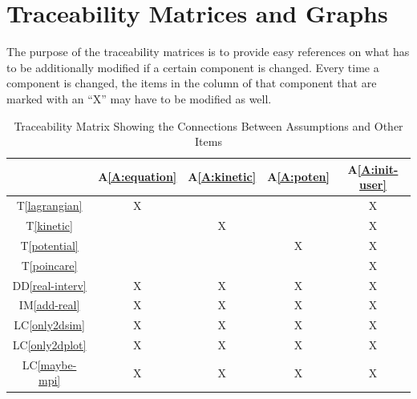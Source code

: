 \documentclass[12pt]{article}
\newcommand{\ddref}[1]{DD\ref{#1}}
\newcommand{\tref}[1]{T\ref{#1}}
\newcommand{\aref}[1]{A\ref{#1}}
\newcommand{\iref}[1]{IM\ref{#1}}
\newcommand{\lcref}[1]{LC\ref{#1}}
\begin{document}
\section{Traceability Matrices and Graphs}

The purpose of the traceability matrices is to provide easy references on what
has to be additionally modified if a certain component is changed.  Every time a
component is changed, the items in the column of that component that are marked
with an ``X'' may have to be modified as well. 


\begin{table}[h!]
\centering
\label{Table:A_trace}
\begin{tabular}{|c|c|c|c|c|}
\hline
	& \aref{A:equation} 
	& \aref{A:kinetic}
	& \aref{A:poten}
	& \aref{A:init-user} \\
\hline
\tref{lagrangian} & X &  &  & X \\ \hline
\tref{kinetic} &  & X &  & X \\ \hline
\tref{potential} &  &  & X & X \\ \hline
\tref{poincare} &  &  &  & X \\ \hline
\ddref{real-interv} & X & X & X & X \\ \hline
\iref{add-real} & X & X & X & X \\ \hline
\lcref{only2dsim} & X & X & X & X \\ \hline
\lcref{only2dplot} & X & X & X & X \\ \hline
\lcref{maybe-mpi} & X & X & X & X\\ \hline
\end{tabular}
\caption{Traceability Matrix Showing the Connections Between Assumptions and Other Items}

\end{table}
\end{document}
